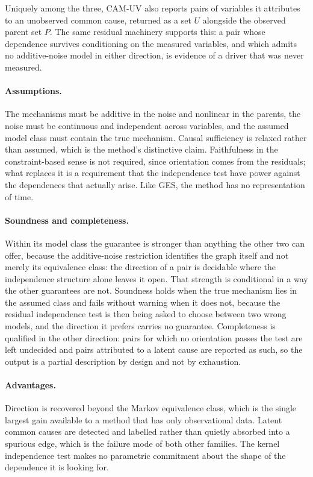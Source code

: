 Uniquely among the three, CAM-UV also reports pairs of variables it attributes to an unobserved common cause, returned as a set $U$ alongside the observed parent set $P$. The same residual machinery supports this: a pair whose dependence survives conditioning on the measured variables, and which admits no additive-noise model in either direction, is evidence of a driver that was never measured.

\paragraph{Assumptions.} The mechanisms must be additive in the noise and nonlinear in the parents, the noise must be continuous and independent across variables, and the assumed model class must contain the true mechanism. Causal sufficiency is relaxed rather than assumed, which is the method's distinctive claim. Faithfulness in the constraint-based sense is not required, since orientation comes from the residuals; what replaces it is a requirement that the independence test have power against the dependences that actually arise. Like GES, the method has no representation of time.

\paragraph{Soundness and completeness.} Within its model class the guarantee is stronger than anything the other two can offer, because the additive-noise restriction identifies the graph itself and not merely its equivalence class: the direction of a pair is decidable where the independence structure alone leaves it open. That strength is conditional in a way the other guarantees are not. Soundness holds when the true mechanism lies in the assumed class and fails without warning when it does not, because the residual independence test is then being asked to choose between two wrong models, and the direction it prefers carries no guarantee. Completeness is qualified in the other direction: pairs for which no orientation passes the test are left undecided and pairs attributed to a latent cause are reported as such, so the output is a partial description by design and not by exhaustion.

\paragraph{Advantages.} Direction is recovered beyond the Markov equivalence class, which is the single largest gain available to a method that has only observational data. Latent common causes are detected and labelled rather than quietly absorbed into a spurious edge, which is the failure mode of both other families. The kernel independence test makes no parametric commitment about the shape of the dependence it is looking for.

